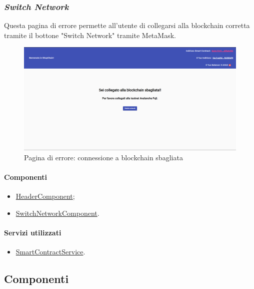 \newpage

\subsubsection*{\textit{Switch Network}}
Questa pagina di errore permette all'utente di collegarsi alla blockchain corretta tramite il bottone "Switch Network" tramite MetaMask.

\begin{figure}[!h] 
    \centering 
    \includegraphics[width=1\columnwidth]{immagini/maschere/switchNetwork.png} 
    \caption{Pagina di errore: connessione a blockchain sbagliata}
\end{figure}

\paragraph{Componenti}
\begin{itemize}
    \item \hyperref[sec:header-component]{HeaderComponent};
    \item \hyperref[sec:switch-component]{SwitchNetworkComponent}.
\end{itemize}

\paragraph{Servizi utilizzati}
\begin{itemize}
    \item \hyperref[sec:smart-contract-service]{SmartContractService}.
\end{itemize}

\newpage


\subsection{Componenti}

